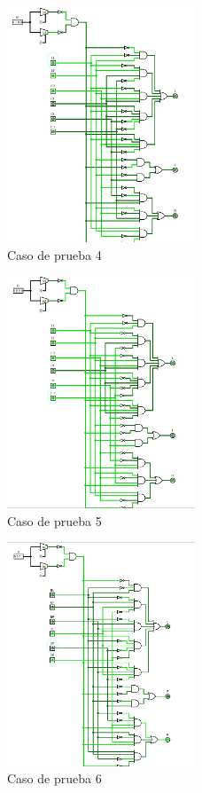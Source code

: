 \documentclass[a4paper]{article}
\begin{document}
\begin{figure}[!htbp]
    \centering
    \includegraphics[width=0.5\textwidth]{caso4.png}
    \caption{Caso de prueba 4}
    \label{fig:Caso4}
\end{figure}
\begin{figure}[!htbp]
    \centering
    \includegraphics[width=0.5\textwidth]{caso5.png}
    \caption{Caso de prueba 5}
    \label{fig:Caso5}
\end{figure}
\begin{figure}[!htbp]
    \centering
    \includegraphics[width=0.5\textwidth]{caso6.png}
    \caption{Caso de prueba 6}
    \label{fig:Caso6}
\end{figure}
\end{document}
